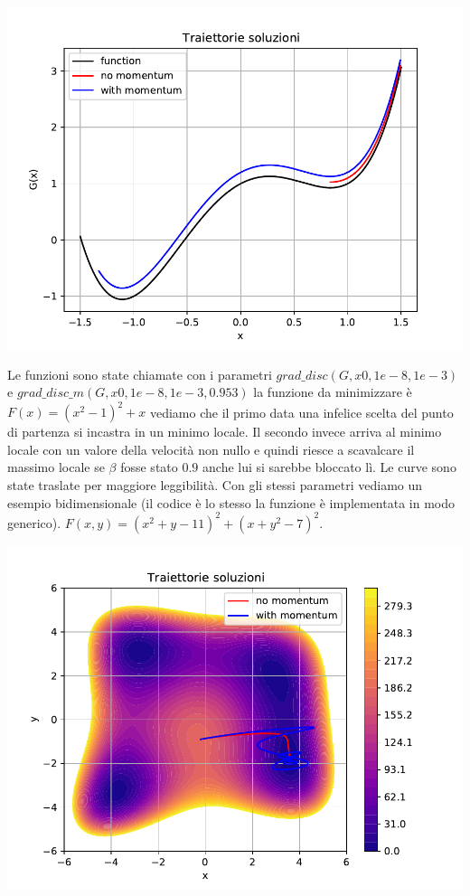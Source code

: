 \documentclass[10pt,a4paper]{article}
\begin{document}
\begin{center}
\includegraphics[scale=0.75]{img/minimo1d.pdf}
\end{center}


Le funzioni sono state chiamate con i parametri $grad\_disc(G, x0, 1e-8, 1e-3)$ e $grad\_disc\_m(G, x0, 1e-8, 1e-3, 0.953)$ la funzione da minimizzare è $F(x)=(x^2 - 1)^2 + x$ vediamo che il primo data una infelice scelta del punto di partenza si incastra in un minimo locale. Il secondo invece arriva al minimo locale con un valore della velocità non nullo e quindi riesce a scavalcare il massimo locale se $\beta$ fosse stato $0.9$ anche lui si sarebbe bloccato lì. Le curve sono state traslate per maggiore leggibilità. Con gli stessi parametri vediamo un esempio bidimensionale (il codice è lo stesso la funzione è implementata in modo generico). $F(x, y) = (x^2 + y - 11)^2 + (x + y^2 - 7)^2$.


\begin{center}
\includegraphics[scale=0.9]{img/minimo2d.pdf}
\end{center}
\end{document}
